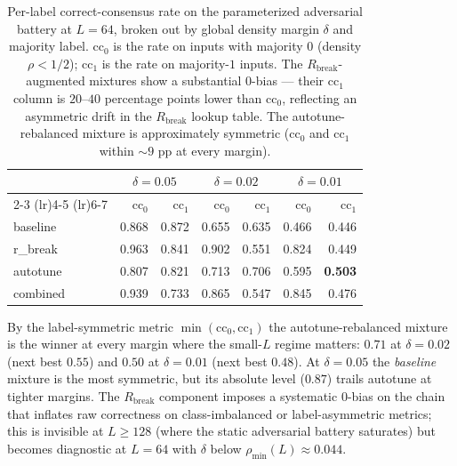 \documentclass[11pt,a4paper]{article}
\begin{document}
\begin{table}[h]\centering\small
\begin{tabular}{l r r r r r r}
\toprule
 & \multicolumn{2}{c}{\(\delta=0.05\)} & \multicolumn{2}{c}{\(\delta=0.02\)} & \multicolumn{2}{c}{\(\delta=0.01\)} \\
\cmidrule(lr){2-3} \cmidrule(lr){4-5} \cmidrule(lr){6-7}
 & cc\(_0\) & cc\(_1\) & cc\(_0\) & cc\(_1\) & cc\(_0\) & cc\(_1\) \\
\midrule
baseline   & 0.868 & 0.872 & 0.655 & 0.635 & 0.466 & 0.446 \\
r\_break   & 0.963 & 0.841 & 0.902 & 0.551 & 0.824 & 0.449 \\
autotune   & 0.807 & 0.821 & 0.713 & 0.706 & 0.595 & \textbf{0.503} \\
combined   & 0.939 & 0.733 & 0.865 & 0.547 & 0.845 & 0.476 \\
\bottomrule
\end{tabular}
\caption{Per-label correct-consensus rate on the parameterized
adversarial battery at \(L=64\), broken out by global density
margin \(\delta\) and majority label.  cc\(_0\) is the rate on
inputs with majority \(0\) (density \(\rho < 1/2\)); cc\(_1\) is
the rate on majority-\(1\) inputs.  The \(R_{\mathrm{break}}\)-
augmented mixtures show a substantial \(0\)-bias --- their cc\(_1\)
column is \(20\)--\(40\) percentage points lower than cc\(_0\),
reflecting an asymmetric drift in the \(R_{\mathrm{break}}\)
lookup table.  The autotune-rebalanced mixture is approximately
symmetric (cc\(_0\) and cc\(_1\) within \(\sim 9\) pp at every
margin).}
\label{tab:tier3-active-adv}
\end{table}

By the label-symmetric metric \(\min(\mathrm{cc}_0, \mathrm{cc}_1)\)
the autotune-rebalanced mixture is the winner at every margin where
the small-\(L\) regime matters: \(0.71\) at \(\delta=0.02\) (next
best \(0.55\)) and \(0.50\) at \(\delta=0.01\) (next best \(0.48\)).
At \(\delta=0.05\) the \emph{baseline} mixture is the most
symmetric, but its absolute level (\(0.87\)) trails autotune at
tighter margins.  The \(R_{\mathrm{break}}\) component imposes a
systematic \(0\)-bias on the chain that inflates raw correctness on
class-imbalanced or label-asymmetric metrics; this is invisible at
\(L \geq 128\) (where the static adversarial battery saturates) but
becomes diagnostic at \(L = 64\) with \(\delta\) below
\(\rho_{\min}(L) \approx 0.044\).
\end{document}
